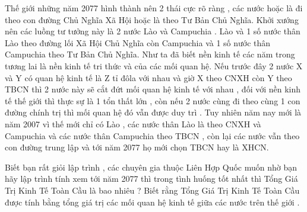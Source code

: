 Thế giới những năm 2077 hình thành nên 2 thái cực rõ ràng , các nước hoặc là đi theo con đường Chủ Nghĩa Xã Hội hoặc là theo Tư Bản Chủ Nghĩa. Khởi xướng nên các luồng tư tưởng này là 2 nước Lào và Campuchia . Lào và 1 số nước thân Lào theo đường lối Xã Hội Chủ Nghĩa còn Campuchia và 1 số nước thân Campuchia theo Tư Bản Chủ Nghĩa. Như ta đã biết nền kinh tế các năm trong tương lai là nền kinh tế tri thức và của các mối quan hệ. Nếu trước đây 2 nước X và Y có quan hệ kinh tế là Z tỉ đôla với nhau và giờ X theo CNXH còn Y theo TBCN thì 2 nước này sẽ cắt đứt mối quan hệ kinh tế với nhau , đối với nền kinh tế thế giới thì thực sự là 1 tổn thất lớn , còn nếu 2 nước cùng đi theo cùng 1 con đường chính trị thì mối quan hệ đó vẫn được duy trì . Tuy nhiên năm nay mới là năm 2007 vì thế mới chỉ có Lào , các nước thân Lào là theo CNXH và Campuchia và các nước thân Campuchia theo TBCN , còn lại các nước vẫn theo con đường trung lập và tới năm 2077 họ mới chọn TBCN hay là XHCN.   


   Biết bạn rất giỏi lập trình , các chuyên gia thuộc Liên Hợp Quốc muốn nhờ bạn hãy lập trình tính xem tới năm 2077 thì trong tình huống tốt nhất thì Tổng Giá Trị Kinh Tế Toàn Cầu là bao nhiêu ? Biết rằng Tổng Giá Trị Kinh Tế Toàn Cầu được tính bằng tổng giá trị các mối quan hệ kinh tế giữa các nước trên thế giới .